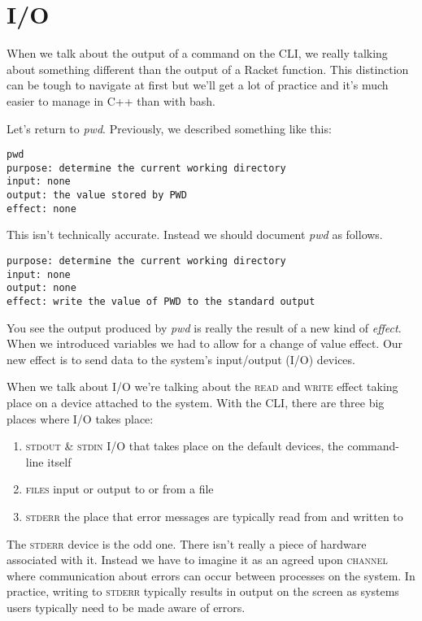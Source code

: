 \documentclass[]{tufte-handout}
\begin{document}
\section{I/O}

When we talk about the output of a command on the CLI, we really talking about something different than the output of a Racket function.  This distinction can be tough to navigate at first but we'll get a lot of practice and it's much easier to manage in C++ than with bash.  

Let's return to \textit{pwd}. Previously, we described something like this:
\begin{verbatim}
pwd
purpose: determine the current working directory
input: none
output: the value stored by PWD
effect: none
\end{verbatim}
This isn't technically accurate. Instead we should document \textit{pwd} as follows.
\begin{verbatim}
purpose: determine the current working directory 
input: none
output: none
effect: write the value of PWD to the standard output
\end{verbatim}

You see the output produced by \textit{pwd} is really the result of a new kind of \textit{effect}. When we introduced variables we had to allow for a change of value effect.  Our new effect is to send data to the system's input/output (I/O) devices.    

When we talk about \textsc{I/O} we're talking about the \textsc{read} and \textsc{write} effect taking place on a device attached to the system. With the CLI, there are three big places where \textsc{I/O} takes place: 
\begin{enumerate}
\item \textsc{stdout} \& \textsc{stdin}  I/O that takes place on the default devices, the command-line itself
\item \textsc{files} input or output to or from a file
\item \textsc{stderr} the place that error messages are typically read from and written to
\end{enumerate}
The \textsc{stderr} device is the odd one.  There isn't really a piece of hardware associated with it. Instead we have to imagine it as an agreed upon \textsc{channel} where communication about errors can occur between processes on the system. In practice, writing to \textsc{stderr} typically results in output on the screen as systems users typically need to be made aware of errors.    
\end{document}

